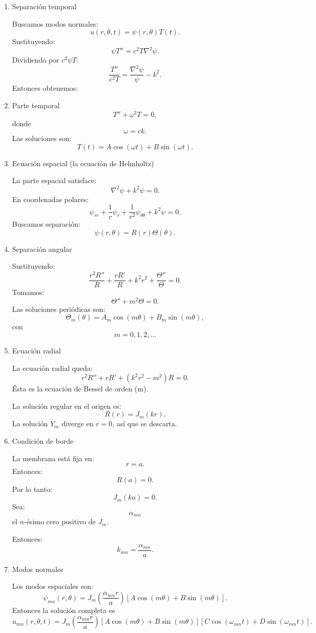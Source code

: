 \documentclass[11pt,spanish]{article}
\begin{document}
\begin{enumerate}
\item Separación temporal

Buscamos modos normales:
$$
u(r,\theta,t)=\psi(r,\theta)T(t).
$$
Sustituyendo:
$$
\psi T''=c^2T\nabla^2\psi.
$$
Dividiendo por $c^2\psi T$:
$$
\frac{T''}{c^2T}
=
\frac{\nabla^2\psi}{\psi}
-k^2.
$$
Entonces obtenemos:

\item Parte temporal
$$
T''+\omega^2T=0,
$$
donde
$$
\omega=ck.
$$
Las soluciones son:
$$
T(t)=A\cos(\omega t)+B\sin(\omega t).
$$

\item Ecuación espacial (la ecuación de Helmholtz)

La parte espacial satisface:
$$
\nabla^2\psi+k^2\psi=0.
$$
En coordenadas polares:
$$
\psi_{rr}
+\frac1r\psi_r
+\frac1{r^2}\psi_{\theta\theta}
+k^2\psi=0.
$$
Buscamos separación:
$$
\psi(r,\theta)=R(r)\Theta(\theta).
$$

\item Separación angular

Sustituyendo:
$$
\frac{r^2R''}{R}
+\frac{rR'}{R}
+k^2r^2
+
\frac{\Theta''}{\Theta}
=0.
$$
Tomamos:
$$
\Theta''+m^2\Theta=0.
$$
Las soluciones periódicas son:
$$
\Theta_m(\theta)=
A_m\cos(m\theta)+B_m\sin(m\theta),
$$
con
$$
m=0,1,2,\dots
$$

\item Ecuación radial

La ecuación radial queda:
$$
r^2R''+rR'+(k^2r^2-m^2)R=0.
$$
Ésta es la ecuación de Bessel de orden (m).

La solución regular en el origen es:
$$
R(r)=J_m(kr).
$$
La solución $Y_m$ diverge en $r=0$, así que se descarta.

\item Condición de borde

La membrana está fija en:
$$
r=a.
$$
Entonces:
$$
R(a)=0.
$$
Por lo tanto:
$$
J_m(ka)=0.
$$
Sea:
$$
\alpha_{mn}
$$
el $n$-ésimo cero positivo de $J_m$.

Entonces:
$$
k_{mn}=\frac{\alpha_{mn}}{a}.
$$

\item Modos normales

Los modos espaciales son:
$$
\psi_{mn}(r,\theta)=
J_m\left(\frac{\alpha_{mn}r}{a}\right)
\left[
A\cos(m\theta)+B\sin(m\theta)
\right].
$$
Entonces la solución completa es
$$
u_{mn}(r,\theta,t)=
J_m\left(\frac{\alpha_{mn}r}{a}\right)
\left[
A\cos(m\theta)+B\sin(m\theta)
\right]
\left[
C\cos(\omega_{mn}t)+D\sin(\omega_{mn}t)
\right].
$$


\end{enumerate}
\end{document}
